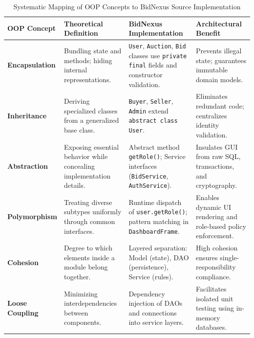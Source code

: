 \begin{table}[H]
\centering
\small
\caption{Systematic Mapping of OOP Concepts to BidNexus Source Implementation}
\label{tab:oop_comparison}
\begin{tabularx}{\textwidth}{p{2.8cm}p{4cm}p{4.2cm}X}
\toprule
\textbf{OOP Concept} & \textbf{Theoretical Definition} & \textbf{BidNexus Implementation} & \textbf{Architectural Benefit} \\
\midrule
\textbf{Encapsulation} & Bundling state and methods; hiding internal representations. & \texttt{User}, \texttt{Auction}, \texttt{Bid} classes use \texttt{private final} fields and constructor validation. & Prevents illegal state; guarantees immutable domain models. \\
\addlinespace
\textbf{Inheritance} & Deriving specialized classes from a generalized base class. & \texttt{Buyer}, \texttt{Seller}, \texttt{Admin} extend \texttt{abstract class User}. & Eliminates redundant code; centralizes identity validation. \\
\addlinespace
\textbf{Abstraction} & Exposing essential behavior while concealing implementation details. & Abstract method \texttt{getRole()}; Service interfaces (\texttt{BidService}, \texttt{AuthService}). & Insulates GUI from raw SQL, transactions, and cryptography. \\
\addlinespace
\textbf{Polymorphism} & Treating diverse subtypes uniformly through common interfaces. & Runtime dispatch of \texttt{user.getRole()}; pattern matching in \texttt{DashboardFrame}. & Enables dynamic UI rendering and role-based policy enforcement. \\
\addlinespace
\textbf{Cohesion} & Degree to which elements inside a module belong together. & Layered separation: Model (state), DAO (persistence), Service (rules). & High cohesion ensures single-responsibility compliance. \\
\addlinespace
\textbf{Loose Coupling} & Minimizing interdependencies between components. & Dependency injection of DAOs and connections into service layers. & Facilitates isolated unit testing using in-memory databases. \\
\bottomrule
\end{tabularx}
\end{table}
